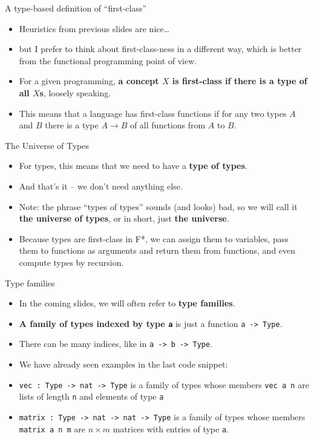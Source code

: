 \documentclass{beamer}
\newcommand{\m}[1]{\texttt{#1}}
\begin{document}
\begin{frame}{A type-based definition of ``first-class''}
\begin{itemize}
	\item Heuristics from previous slides are nice\dots
	\item but I prefer to think about first-class-ness in a different way, which is better from the functional programming point of view.
	\item For a given programming, \textbf{a concept $X$ is first-class if there is a type of all $X$s}, loosely speaking.
	\item This means that a language has first-class functions if for any two types $A$ and $B$ there is a type $A \to B$ of all functions from $A$ to $B$.
\end{itemize}
\end{frame}

\begin{frame}{The Universe of Types}
\begin{itemize}
	\item For types, this means that we need to have a \textbf{type of types}.
	\item And that's it -- we don't need anything else.
	\item Note: the phrase ``types of types'' sounds (and looks) bad, so we will call it \textbf{the universe of types}, or in short, just \textbf{the universe}.
	\item Because types are first-class in F*, we can assign them to variables, pass them to functions as arguments and return them from functions, and even compute types by recursion.
\end{itemize}
\end{frame}

\begin{frame}{Type families}
\begin{itemize}
	\item In the coming slides, we will often refer to \textbf{type families}.
	\item \textbf{A family of types indexed by type \m{a}} is just a function \m{a -> Type}.
	\item There can be many indices, like in \m{a -> b -> Type}.
	\item We have already seen examples in the last code snippet:
	\item \m{vec :\ Type -> nat -> Type} is a family of types whose members \m{vec a n} are lists of length \m{n} and elements of type \m{a}
	\item \m{matrix :\ Type -> nat -> nat -> Type} is a family of types whose members \m{matrix a n m} are $n \times m$ matrices with entries of type \m{a}.
\end{itemize}
\end{frame}
\end{document}
